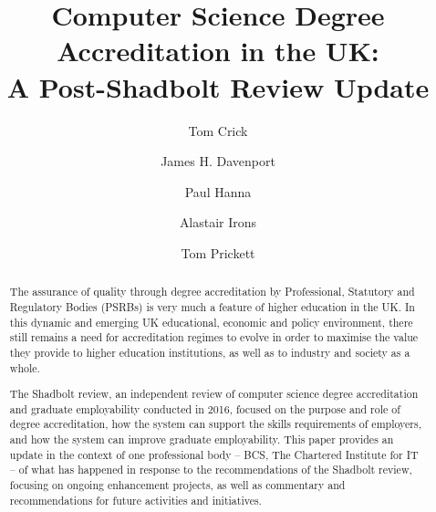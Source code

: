 \documentclass[sigconf]{acmart}
\begin{document}
\title[UK Computer Science Degree Accreditation,
Post-Shadbolt]{Computer Science Degree Accreditation in the UK:\\A
Post-Shadbolt Review Update}


\author{Tom Crick}

\author{James H. Davenport}

\author{Paul Hanna}

\author{Alastair Irons}

\author{Tom Prickett}


\renewcommand{\shortauthors}{Crick, Davenport, Hanna, Irons, and Prickett}

\begin{abstract}
The assurance of quality through degree accreditation by Professional,
Statutory and Regulatory Bodies (PSRBs) is very much a feature of
higher education in the UK.  In this dynamic and emerging UK
educational, economic and policy environment, there still remains a
need for accreditation regimes to evolve in order to maximise the
value they provide to higher education institutions, as well as to
industry and society as a whole.

The Shadbolt review, an independent review of computer science degree
accreditation and graduate employability conducted in 2016, focused on
the purpose and role of degree accreditation, how the system can
support the skills requirements of employers, and how the system can
improve graduate employability. This paper provides an update in the
context of one professional body -- BCS, The Chartered Institute for
IT -- of what has happened in response to the recommendations of the
Shadbolt review, focusing on ongoing enhancement projects, as well as
commentary and recommendations for future activities and initiatives.
\end{abstract}
\end{document}
